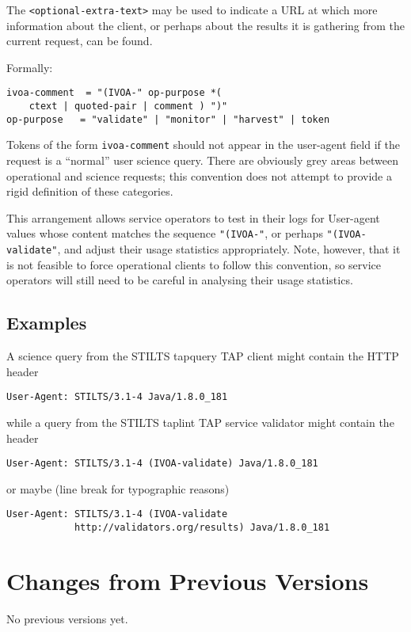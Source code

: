 \documentclass[11pt,a4paper]{ivoa}
\begin{document}
The \verb|<optional-extra-text>| may  be used to indicate a URL at which
more information about the client, or perhaps about the results it is
gathering from the current request, can be found.

Formally:

\begin{lstlisting}
ivoa-comment  = "(IVOA-" op-purpose *( 
    ctext | quoted-pair | comment ) ")"
op-purpose   = "validate" | "monitor" | "harvest" | token
\end{lstlisting}

Tokens of the form \verb|ivoa-comment| should not appear in the
user-agent field if the request is a ``normal'' user science query. There
are obviously grey areas between operational and science requests; this
convention does not attempt to provide a rigid definition of these
categories.

This arrangement allows service operators to test in their logs for
User-agent values whose content matches the sequence \verb|"(IVOA-"|, or
perhaps \verb|"(IVOA-validate"|, and adjust their usage statistics
appropriately. Note, however, that it is not feasible to force operational
clients to follow this convention, so service operators will still need
to be careful in analysing their usage statistics.

\subsection{Examples}

A science query from the STILTS tapquery TAP client might contain the
HTTP header
\begin{lstlisting}
User-Agent: STILTS/3.1-4 Java/1.8.0_181
\end{lstlisting}
while a query from the STILTS taplint TAP service validator might
contain the header
\begin{lstlisting}
User-Agent: STILTS/3.1-4 (IVOA-validate) Java/1.8.0_181
\end{lstlisting}
or maybe (line break for typographic reasons)
\begin{lstlisting}
User-Agent: STILTS/3.1-4 (IVOA-validate
            http://validators.org/results) Java/1.8.0_181
\end{lstlisting}

\appendix
\section{Changes from Previous Versions}

No previous versions yet.  



\end{document}
